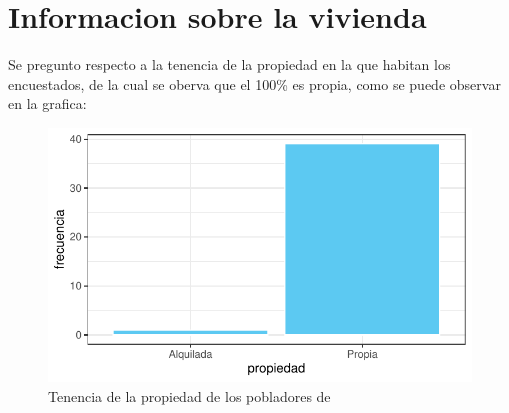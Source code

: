 \documentclass[12pt]{article}\usepackage[]{graphicx}\usepackage[]{xcolor}
\makeatletter
\def\maxwidth{ %
  \ifdim\Gin@nat@width>\linewidth
    \linewidth
  \else
    \Gin@nat@width
  \fi
}
\newenvironment{knitrout}{}{} %
\makeatother
\begin{document}
	\section{Informacion sobre la vivienda}
Se pregunto respecto a la tenencia de la propiedad en la que habitan los encuestados, de la cual se oberva que el 100\% es propia, como se puede observar en la grafica:
	\begin{figure}[H]
	\centering
\begin{knitrout}
\color{fgcolor}
\includegraphics[width=\maxwidth]{figure/tres-1} 
\end{knitrout}
	\caption{Tenencia de la propiedad de los pobladores de \comunidad}
	\end{figure}
	
\end{document}
